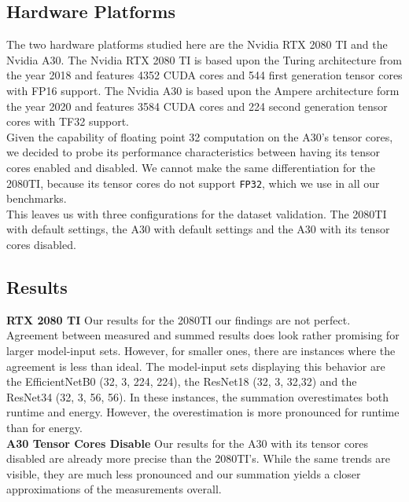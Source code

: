 \subsection{Hardware Platforms}
The two hardware platforms studied here are the Nvidia RTX 2080 TI and the Nvidia A30. The Nvidia RTX 2080 TI is based upon the Turing architecture from the year 2018 and features 4352 CUDA cores and 544 first generation tensor cores with FP16 support. The Nvidia A30 is based upon the Ampere architecture form the year 2020 and features 3584 CUDA cores and 224 second generation tensor cores with TF32 support.\\
Given the capability of floating point 32 computation on the A30's tensor cores, we decided to probe its performance characteristics between having its tensor cores enabled and disabled. We cannot make the same differentiation for the 2080TI, because its tensor cores do not support \texttt{FP32}, which we use in all our benchmarks. \\
This leaves us with three configurations for the dataset validation. The 2080TI with default settings, the A30 with default settings and the A30 with its tensor cores disabled.


\subsection{Results}

\textbf{RTX 2080 TI} Our results for the 2080TI our findings are not perfect. Agreement between measured and summed results does look rather promising for larger model-input sets. However, for smaller ones, there are instances where the agreement is less than ideal. The model-input sets displaying this behavior are the EfficientNetB0 (32, 3, 224, 224), the ResNet18 (32, 3, 32,32) and the ResNet34 (32, 3, 56, 56). In these instances, the summation overestimates both runtime and energy. However, the overestimation is more pronounced for runtime than for energy. \\
 

\textbf{A30 Tensor Cores Disable} Our results for the A30 with its tensor cores disabled are already more precise than the 2080TI's. While the same trends are visible, they are much less pronounced and our summation yields a closer approximations of the measurements overall. 


